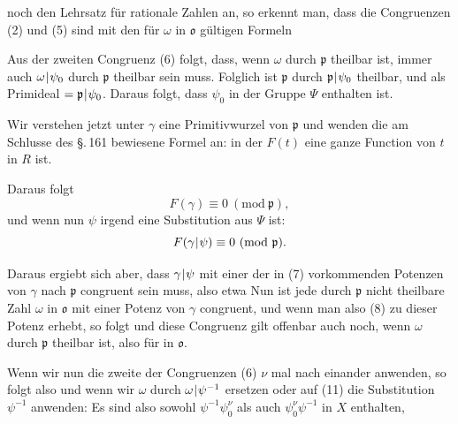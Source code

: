 noch den  Lehrsatz für rationale Zahlen an, so erkennt man, dass die Congruenzen (2) und (5)  sind mit den für  $\omega$ in $\mathfrak{o}$ gültigen Formeln

Aus der zweiten Congruenz (6) folgt, dass, wenn $\omega$ durch $\mathfrak{p}$ theilbar ist, immer auch $\omega\mkern1mu|\mkern1mu\psi_0$ durch $\mathfrak{p}$ theilbar sein muss. Folglich ist $\mathfrak{p}$ durch $\mathfrak{p}\mkern1mu|\mkern1mu\psi_0$ theilbar, und als Primideal $= \mathfrak{p}\mkern1mu|\mkern1mu\psi_0$. Daraus folgt, dass $\psi_0$ in der Gruppe $\Psi$ enthalten ist.

Wir verstehen jetzt unter $\gamma$ eine Primitivwurzel von $\mathfrak{p}$ und wenden die am Schlusse des \S.\,161 bewiesene Formel an:
in der $F(t)$ eine ganze Function von $t$ in $R$ ist.

Daraus folgt
\[ F(\gamma) \equiv 0\ (\mathrm{mod}\ \mathfrak{p}), \]
und wenn nun $\psi$ irgend eine Substitution aus $\Psi$ ist:
\[ F(\gamma\mkern1mu|\mkern1mu\psi) \equiv 0\ (\mathrm{mod}\ \mathfrak{p}). \]

Daraus ergiebt sich aber, dass $\gamma\mkern1mu|\mkern1mu\psi$ mit einer der in (7) vorkommenden Potenzen von $\gamma$ nach $\mathfrak{p}$ congruent sein muss, also etwa
Nun ist jede durch $\mathfrak{p}$ nicht theilbare Zahl $\omega$ in $\mathfrak{o}$ mit einer Potenz von $\gamma$ congruent, und wenn man also (8) zu dieser Potenz erhebt, so folgt
und diese Congruenz gilt offenbar auch noch, wenn $\omega$ durch $\mathfrak{p}$ theilbar ist, also für  in $\mathfrak{o}$.

Wenn wir nun die zweite der Congruenzen (6) $\nu$ mal nach einander anwenden, so folgt
also
und wenn wir $\omega$ durch $\omega\mkern1mu|\mkern1mu\psi^{-1}$ ersetzen oder auf (11) die Substitution $\psi^{-1}$ anwenden:
Es sind also sowohl $\psi^{-1}\psi_0^\nu$ als auch $\psi_0^\nu\psi^{-1}$ in $X$ enthalten,
